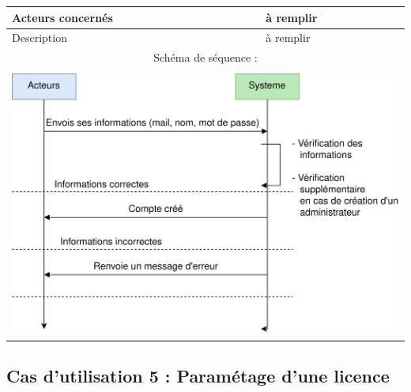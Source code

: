 \begin{table}[!h]
        \centering
        \begin{tabular}{| m{5cm} | m{10cm} |}
                \hline
                    Acteurs concernés & à remplir \\
                \hline
                    Description & à remplir \\
                \hline
                    \multicolumn{2}{|c|}{Schéma de séquence :} \\
                \hline
                    \multicolumn{2}{|c|}{}\\
                    \multicolumn{2}{|c|}{\includegraphics[width=15cm]{main/png/seq_creation.png}} \\
                \hline
        \end{tabular}
        \label{tab:tab4}
\end{table}
\newpage

\subsection{Cas d'utilisation 5 : Paramétage d'une licence}

